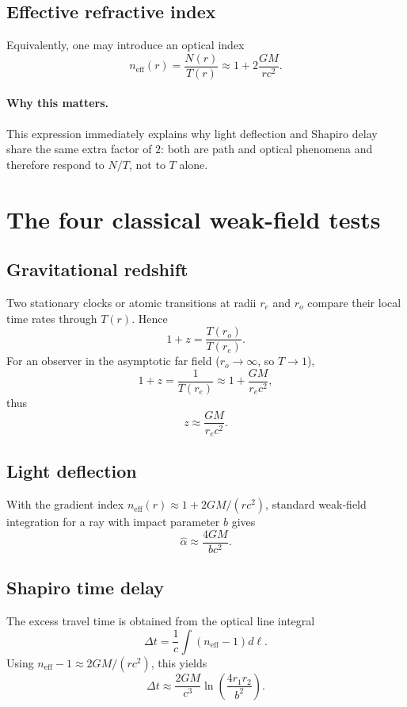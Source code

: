 \documentclass[11pt,a4paper]{article}
\begin{document}
\subsection{Effective refractive index}
Equivalently, one may introduce an optical index
\begin{equation}
\boxed{
 n_{\text{eff}}(r) = \frac{N(r)}{T(r)} \approx 1+2\frac{GM}{rc^2}.
}
\end{equation}

\paragraph{Why this matters.}
This expression immediately explains why light deflection and Shapiro delay share the same extra factor of $2$: both are path and optical phenomena and therefore respond to $N/T$, not to $T$ alone.

\section{The four classical weak-field tests}
\subsection{Gravitational redshift}
Two stationary clocks or atomic transitions at radii $r_e$ and $r_o$ compare their local time rates through $T(r)$. Hence
\begin{equation}
 1+z = \frac{T(r_o)}{T(r_e)}.
\end{equation}
For an observer in the asymptotic far field ($r_o\to\infty$, so $T\to1$),
\begin{equation}
 1+z = \frac{1}{T(r_e)} \approx 1+\frac{GM}{r_e c^2},
\end{equation}
thus
\begin{equation}
\boxed{
 z \approx \frac{GM}{r_e c^2}.
}
\end{equation}

\subsection{Light deflection}
With the gradient index $n_{\text{eff}}(r)\approx1+2GM/(rc^2)$, standard weak-field integration for a ray with impact parameter $b$ gives
\begin{equation}
\boxed{
 \hat\alpha \approx \frac{4GM}{b c^2}.
}
\end{equation}

\subsection{Shapiro time delay}
The excess travel time is obtained from the optical line integral
\begin{equation}
 \Delta t = \frac{1}{c}\int\left(n_{\text{eff}}-1\right)d\ell.
\end{equation}
Using $n_{\text{eff}}-1\approx2GM/(rc^2)$, this yields
\begin{equation}
\boxed{
 \Delta t \approx \frac{2GM}{c^3}\ln\left(\frac{4r_1r_2}{b^2}\right).
}
\end{equation}
\end{document}
